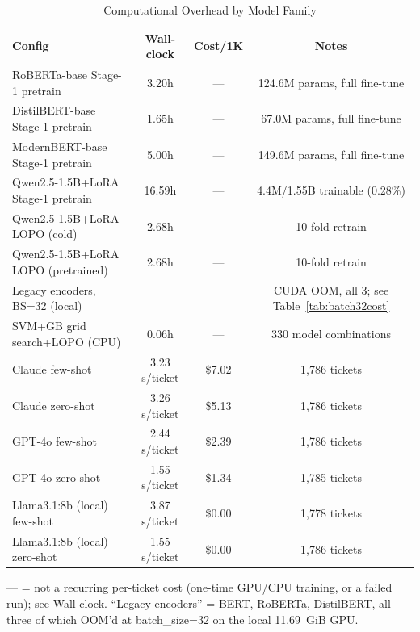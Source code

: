 \documentclass[preprint,12pt]{elsarticle}
\begin{document}
\begin{table}[t]
\centering
\footnotesize
\setlength{\tabcolsep}{3pt}
\begin{tabular}{lccc}
\toprule
\textbf{Config} & \textbf{Wall-clock} & \textbf{Cost/1K} & \textbf{Notes} \\
\midrule
RoBERTa-base Stage-1 pretrain & 3.20h & --- & 124.6M params, full fine-tune \\
DistilBERT-base Stage-1 pretrain & 1.65h & --- & 67.0M params, full fine-tune \\
ModernBERT-base Stage-1 pretrain & 5.00h & --- & 149.6M params, full fine-tune \\
Qwen2.5-1.5B+LoRA Stage-1 pretrain & 16.59h & --- & 4.4M/1.55B trainable (0.28\%) \\
Qwen2.5-1.5B+LoRA LOPO (cold) & 2.68h & --- & 10-fold retrain \\
Qwen2.5-1.5B+LoRA LOPO (pretrained) & 2.68h & --- & 10-fold retrain \\
Legacy encoders, BS=32 (local) & --- & --- & CUDA OOM, all 3; see Table~\ref{tab:batch32cost} \\
SVM+GB grid search+LOPO (CPU) & 0.06h & --- & 330 model combinations \\
Claude few-shot & 3.23 s/ticket & \$7.02 & 1,786 tickets \\
Claude zero-shot & 3.26 s/ticket & \$5.13 & 1,786 tickets \\
GPT-4o few-shot & 2.44 s/ticket & \$2.39 & 1,786 tickets \\
GPT-4o zero-shot & 1.55 s/ticket & \$1.34 & 1,785 tickets \\
Llama3.1:8b (local) few-shot & 3.87 s/ticket & \$0.00 & 1,778 tickets \\
Llama3.1:8b (local) zero-shot & 1.55 s/ticket & \$0.00 & 1,786 tickets \\
\bottomrule
\end{tabular}
\caption{Computational Overhead by Model Family}
\label{tab:overhead}
\begin{flushleft}
\footnotesize --- = not a recurring per-ticket cost (one-time GPU/CPU training, or a failed run); see Wall-clock. ``Legacy encoders'' = BERT, RoBERTa, DistilBERT, all three of which OOM'd at batch\_size=32 on the local 11.69~GiB GPU.
\end{flushleft}
\end{table}
\end{document}

